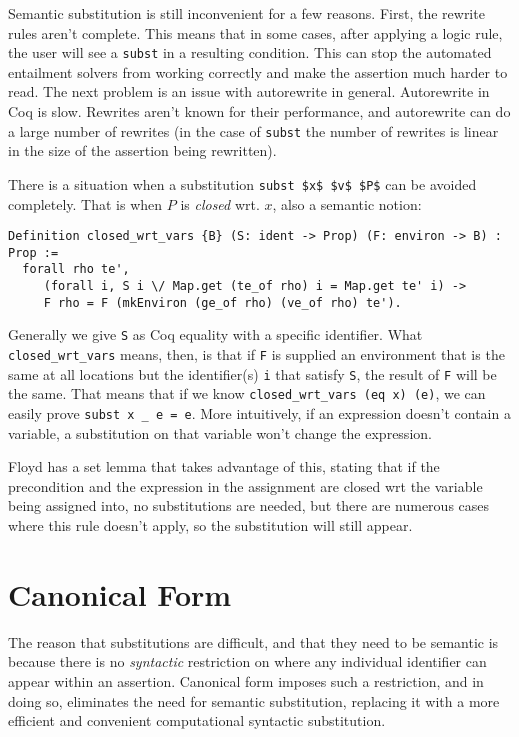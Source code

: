 \documentclass{puthesis}
\begin{document}
Semantic substitution is still inconvenient for a few reasons. First,
the rewrite rules aren't complete. This means that in some cases, after
applying a logic rule, the user will see a \lstinline|subst| in a
resulting condition. This can stop the automated entailment
solvers from working correctly and make the assertion much harder
to read. The next problem is an issue with autorewrite in general.
Autorewrite in Coq is slow. Rewrites aren't known for their 
performance, and autorewrite can do a large number of rewrites
(in the case of \lstinline|subst| the number of rewrites is
linear in the size of the assertion being rewritten). 

There is a situation when a substitution \lstinline|subst $x$ $v$ $P$| can
be avoided completely. That is when $P$ is \emph{closed} wrt. 
$x$, also a semantic notion:

\begin{lstlisting}
Definition closed_wrt_vars {B} (S: ident -> Prop) (F: environ -> B) : Prop := 
  forall rho te',  
     (forall i, S i \/ Map.get (te_of rho) i = Map.get te' i) ->
     F rho = F (mkEnviron (ge_of rho) (ve_of rho) te').
\end{lstlisting}

Generally we give \lstinline|S| as Coq equality with a specific identifier. 
What \lstinline|closed_wrt_vars| means, then, is that if \lstinline|F|
is supplied an environment that is the same at all locations but 
the identifier(s) \lstinline|i| that satisfy \lstinline|S|, the
result of \lstinline|F| will be the same. That means that if we know
\lstinline|closed_wrt_vars (eq x) (e)|, we can easily prove
\lstinline|subst x _ e = e|. More intuitively, if an expression
doesn't contain a variable, a substitution on that variable
won't change the expression. 

Floyd has a set lemma that takes advantage of this, stating that if
the precondition and the expression in the assignment
are closed wrt the variable being assigned into, no substitutions are
needed, but there are numerous cases where this rule doesn't apply, 
so the substitution will still appear. 

\section{Canonical Form}

The reason that substitutions are difficult, and that they need
to be semantic is because there is no \emph{syntactic} restriction
on where any individual identifier can appear within an assertion.
Canonical form imposes such a restriction, and in doing so, eliminates
the need for semantic substitution, replacing it with a more
efficient and convenient computational syntactic substitution.
\end{document}

